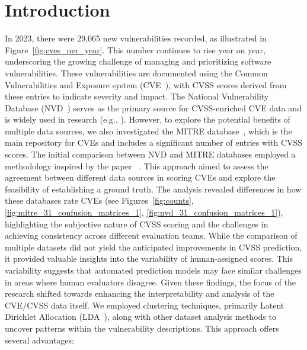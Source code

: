\section{Introduction}

In 2023, there were 29,065 new vulnerabilities recorded, as illustrated in Figure~\ref{fig:cves_per_year}. This number continues to rise year on year, underscoring the growing challenge of managing and prioritizing software vulnerabilities. These vulnerabilities are documented using the Common Vulnerabilities and Exposure system (CVE~\cite{CVE}), with CVSS scores derived from these entries to indicate severity and impact. The National Vulnerability Database (NVD~\cite{NVD}) serves as the primary source for CVSS-enriched CVE data and is widely used in research (e.g., \cite{costa, nvd_example1, nvd_example2}). However, to explore the potential benefits of multiple data sources, we also investigated the MITRE database~\cite{MITRE}, which is the main repository for CVEs and includes a significant number of entries with CVSS scores. The initial comparison between NVD and MITRE databases employed a methodology inspired by the paper ~\cite{bayes}. This approach aimed to assess the agreement between different data sources in scoring CVEs and explore the feasibility of establishing a ground truth. The analysis revealed differences in how these databases rate CVEs (see Figures~\ref{fig:counts}, \ref{fig:mitre_31_confusion_matrices_1}, \ref{fig:nvd_31_confusion_matrices_1}), highlighting the subjective nature of CVSS scoring and the challenges in achieving consistency across different evaluation teams. While the comparison of multiple datasets did not yield the anticipated improvements in CVSS prediction, it provided valuable insights into the variability of human-assigned scores. This variability suggests that automated prediction models may face similar challenges in areas where human evaluators disagree. Given these findings, the focus of the research shifted towards enhancing the interpretability and analysis of the CVE/CVSS data itself. We employed clustering techniques, primarily Latent Dirichlet Allocation (LDA~\cite{lda_origin}), along with other dataset analysis methods to uncover patterns within the vulnerability descriptions. This approach offers several advantages:
